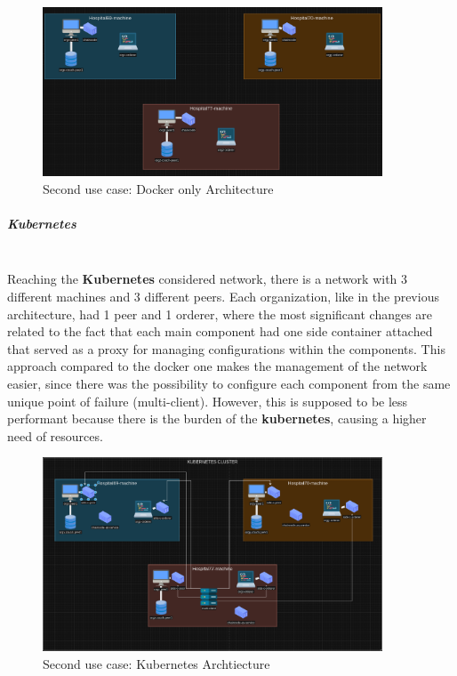 \begin{figure}[H]
	\centering
	\includegraphics[width=0.9\textwidth]{assets/use-case-2/docker.png} %
	\caption{Second use case: Docker only Architecture}
	\label{fig:sample-image} 
\end{figure}

\subparagraph{Kubernetes} \mbox{}\\
Reaching the \textbf{Kubernetes} considered network, there is a network with 3 different machines and 3 different peers. Each organization, like in the previous architecture, had 1 peer and 1 orderer, where the most significant changes are related to the fact that each main component had one side container attached that served as a proxy for managing configurations within the components. This approach compared to the docker one makes the management of the network easier, since there was the possibility to configure each component from the same unique point of failure (multi-client). However, this is supposed to be less performant because there is the burden of the \textbf{kubernetes}, causing a higher need of resources.

\begin{figure}[H]
	\centering
	\includegraphics[width=0.9\textwidth]{assets/use-case-2/k8.png} %
	\caption{Second use case: Kubernetes Archtiecture}
	\label{fig:sample-image} 
\end{figure}


